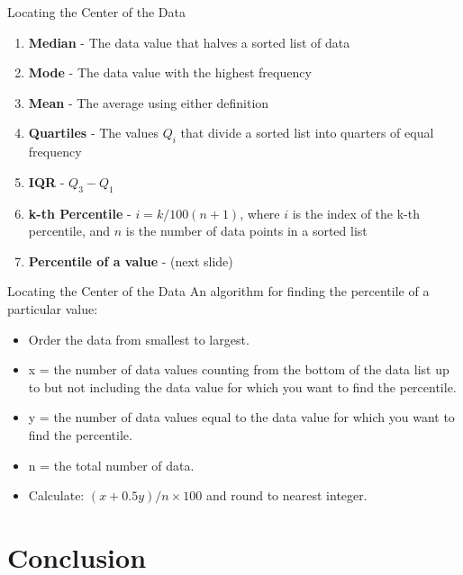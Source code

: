 \documentclass{beamer}
\begin{document}
\begin{frame}{Locating the Center of the Data}
\begin{enumerate}
\item \textbf{\alert{Median}} - The data value that halves a sorted list of data
\item \textbf{\alert{Mode}} - The data value with the highest frequency
\item \textbf{\alert{Mean}} - The average using either definition
\item \textbf{\alert{Quartiles}} - The values $Q_i$ that divide a sorted list into quarters of equal frequency
\item \textbf{\alert{IQR}} - $Q_3 - Q_1$
\item \textbf{\alert{k-th Percentile}} - $i = k/100 (n+1)$, where $i$ is the index of the k-th percentile, and $n$ is the number of data points in a sorted list
\item \textbf{\alert{Percentile of a value}} - (next slide)
\end{enumerate}
\end{frame}

\begin{frame}{Locating the Center of the Data}
An algorithm for finding the percentile of a particular value:
\begin{itemize}
\item Order the data from smallest to largest.
\item x = the number of data values counting from the bottom of the data list up to but not including the data value for which
you want to find the percentile.
\item y = the number of data values equal to the data value for which you want to find the percentile.
\item n = the total number of data.
\item Calculate: $(x+0.5y)/n \times 100$ and round to nearest integer.
\end{itemize}
\end{frame}

\section{Conclusion}
\end{document}
